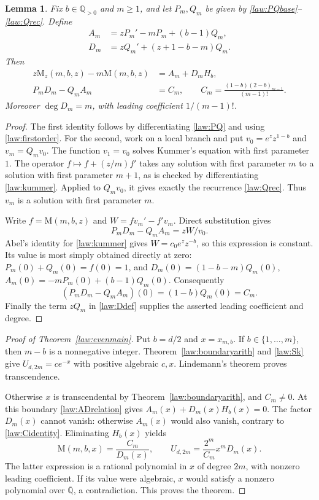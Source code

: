 \documentclass[11pt,a4paper]{article}
\newcommand{\Q}{\mathbb Q}
\newcommand{\Qbar}{\overline{\mathbb Q}}
\newcommand{\M}{\mathrm M}
\newtheorem{lemma}[theorem]{Lemma}
\theoremstyle{definition}
\theoremstyle{remark}
\numberwithin{equation}{section}
\begin{document}
\begin{lemma}\label{law:detidentity}
Fix $b\in\Q_{>0}$ and $m\geq1$, and let $P_m,Q_m$ be given by
\eqref{law:PQbase}--\eqref{law:Qrec}. Define
\begin{align}
 A_m&=zP_m'-mP_m+(b-1)Q_m,\label{law:Adef}\\
 D_m&=zQ_m'+(z+1-b-m)Q_m.\label{law:Ddef}
\end{align}
Then
\begin{align}
 z\M_z(m,b,z)-m\M(m,b,z)&=A_m+D_mH_b,\label{law:ADrelation}\\
 P_mD_m-Q_mA_m&=C_m,
 \qquad C_m=\frac{(1-b)(2-b)_{m-1}}{(m-1)!}.
 \label{law:Cidentity}
\end{align}
Moreover $\deg D_m=m$, with leading coefficient $1/(m-1)!$.
\end{lemma}
\begin{proof}
The first identity follows by differentiating \eqref{law:PQ} and using
\eqref{law:firstorder}. For the second, work on a local branch and put
$v_0=e^zz^{1-b}$ and $v_m=Q_mv_0$. The function $v_1=v_0$ solves
Kummer's equation with first parameter $1$. The operator
$f\mapsto f+(z/m)f'$ takes any solution with first parameter $m$
to a solution with first parameter $m+1$, as is checked by
differentiating \eqref{law:kummer}. Applied to $Q_mv_0$, it gives exactly
the recurrence \eqref{law:Qrec}. Thus $v_m$ is a solution with first
parameter $m$.

Write $f=\M(m,b,z)$ and $W=fv_m'-f'v_m$. Direct substitution gives
\[
 P_mD_m-Q_mA_m=zW/v_0.
\]
Abel's identity for \eqref{law:kummer} gives $W=c_0e^zz^{-b}$, so this
expression is constant. Its value is most simply obtained directly
at zero: $P_m(0)+Q_m(0)=f(0)=1$, and
$D_m(0)=(1-b-m)Q_m(0)$,
$A_m(0)=-mP_m(0)+(b-1)Q_m(0)$. Consequently
\[
 (P_mD_m-Q_mA_m)(0)=(1-b)Q_m(0)=C_m.
\]
Finally the term $zQ_m$ in \eqref{law:Ddef} supplies the asserted leading
coefficient and degree.
\end{proof}

\begin{proof}[Proof of Theorem~\ref{law:evenmain}]
Put $b=d/2$ and $x=x_{m,b}$. If $b\in\{1,\ldots,m\}$, then
$m-b$ is a nonnegative integer. Theorem~\ref{law:boundaryarith} and
\eqref{law:Sk} give
$U_{d,2m}=c e^{-x}$ with positive algebraic $c,x$.
Lindemann's theorem proves transcendence.

Otherwise $x$ is transcendental by Theorem~\ref{law:boundaryarith},
and $C_m\ne0$. At this boundary \eqref{law:ADrelation} gives
$A_m(x)+D_m(x)H_b(x)=0$. The factor $D_m(x)$ cannot vanish: otherwise
$A_m(x)$ would also vanish, contrary to \eqref{law:Cidentity}.
Eliminating $H_b(x)$ yields
\begin{equation}\label{law:evenpolynomial}
 \M(m,b,x)=\frac{C_m}{D_m(x)},\qquad
 U_{d,2m}=\frac{2^m}{C_m}x^mD_m(x).
\end{equation}
The latter expression is a rational polynomial in $x$ of degree
$2m$, with nonzero leading coefficient. If its value were algebraic,
$x$ would satisfy a nonzero polynomial over $\Qbar$, a contradiction.
This proves the theorem.
\end{proof}
\end{document}
